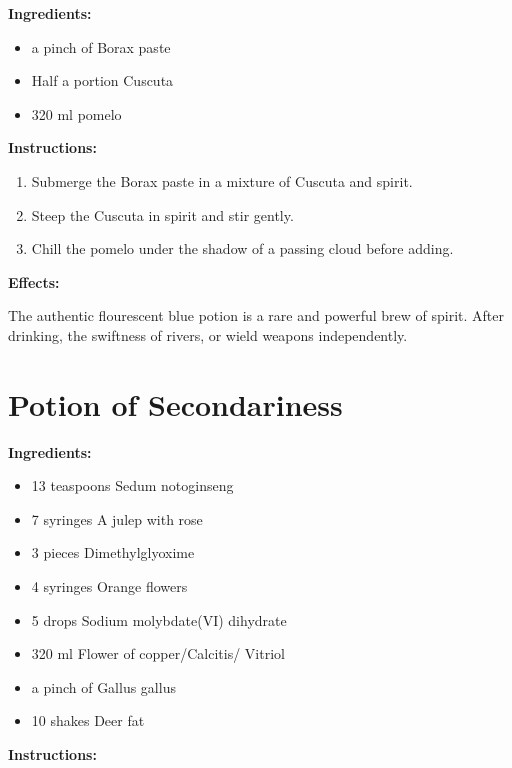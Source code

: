 \documentclass{article}
\begin{document}
\textbf{Ingredients:}

\begin{itemize}
  \item a pinch of Borax paste
  \item Half a portion Cuscuta
  \item 320 ml pomelo
\end{itemize}

\textbf{Instructions:}

\begin{enumerate}
  \item Submerge the Borax paste in a mixture of Cuscuta and spirit.
  \item Steep the Cuscuta in spirit and stir gently.
  \item Chill the pomelo under the shadow of a passing cloud before adding.
\end{enumerate}

\textbf{Effects:}

The authentic flourescent blue potion is a rare and powerful brew of spirit. After drinking, the swiftness of rivers, or wield weapons independently.

\newpage
\section*{Potion of Secondariness}

\textbf{Ingredients:}

\begin{itemize}
  \item 13 teaspoons Sedum notoginseng
  \item 7 syringes A julep with rose
  \item 3 pieces Dimethylglyoxime
  \item 4 syringes Orange flowers
  \item 5 drops Sodium molybdate(VI) dihydrate
  \item 320 ml Flower of copper/Calcitis/ Vitriol
  \item a pinch of Gallus gallus
  \item 10 shakes Deer fat
\end{itemize}

\textbf{Instructions:}
\end{document}
